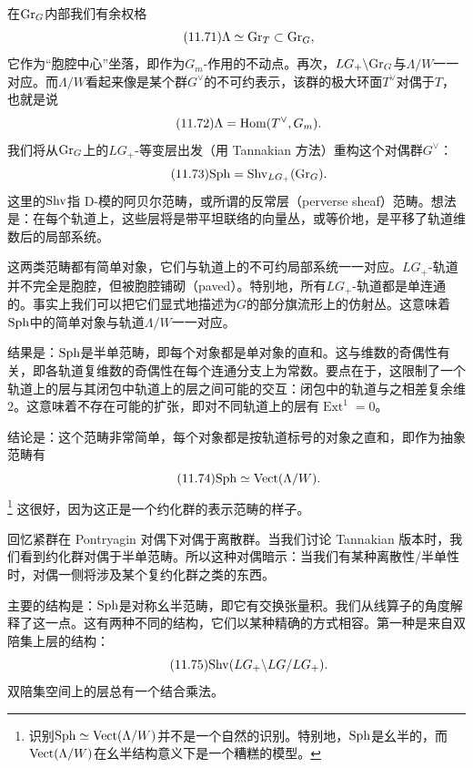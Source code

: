 在$\mathrm{Gr}_G$内部我们有余权格
\begin{equation}\tag{11.71}
\Lambda\simeq\mathrm{Gr}_T\subset\mathrm{Gr}_G,
\end{equation}
它作为“胞腔中心”坐落，即作为$G_m$-作用的不动点。再次，$LG_+\backslash\mathrm{Gr}_G$与$\Lambda/W$一一对应。而$\Lambda/W$看起来像是某个群$G^{\vee}$的不可约表示，该群的极大环面$T^{\vee}$对偶于$T$，也就是说
\begin{equation}\tag{11.72}
\Lambda=\mathrm{Hom}(T^{\vee},G_m).
\end{equation}
我们将从$\mathrm{Gr}_G$上的$LG_+$-等变层出发（用 Tannakian 方法）重构这个对偶群$G^{\vee}$：
\begin{equation}\tag{11.73}
\mathrm{Sph}=\mathrm{Shv}_{LG_+}(\mathrm{Gr}_G).
\end{equation}
这里的$\mathrm{Shv}$指 D-模的阿贝尔范畴，或所谓的反常层（perverse sheaf）范畴。想法是：在每个轨道上，这些层将是带平坦联络的向量丛，或等价地，是平移了轨道维数后的局部系统。

这两类范畴都有简单对象，它们与轨道上的不可约局部系统一一对应。$LG_+$-轨道并不完全是胞腔，但被胞腔铺砌（paved）。特别地，所有$LG_+$-轨道都是单连通的。事实上我们可以把它们显式地描述为$G$的部分旗流形上的仿射丛。这意味着$\mathrm{Sph}$中的简单对象与轨道$\Lambda/W$一一对应。

结果是：$\mathrm{Sph}$是半单范畴，即每个对象都是单对象的直和。这与维数的奇偶性有关，即各轨道复维数的奇偶性在每个连通分支上为常数。要点在于，这限制了一个轨道上的层与其闭包中轨道上的层之间可能的交互：闭包中的轨道与之相差复余维$2$。这意味着不存在可能的扩张，即对不同轨道上的层有$\operatorname{Ext}^{1}=0$。

结论是：这个范畴非常简单，每个对象都是按轨道标号的对象之直和，即作为抽象范畴有
\begin{equation}\tag{11.74}
\mathrm{Sph}\simeq\mathrm{Vect}(\Lambda/W).
\end{equation}
\footnote{识别$\mathrm{Sph}\simeq\mathrm{Vect}(\Lambda/W)$并不是一个自然的识别。特别地，$\mathrm{Sph}$是幺半的，而$\mathrm{Vect}(\Lambda/W)$在幺半结构意义下是一个糟糕的模型。}
这很好，因为这正是一个约化群的表示范畴的样子。

回忆紧群在 Pontryagin 对偶下对偶于离散群。当我们讨论 Tannakian 版本时，我们看到约化群对偶于半单范畴。所以这种对偶暗示：当我们有某种离散性/半单性时，对偶一侧将涉及某个复约化群之类的东西。

主要的结构是：$\mathrm{Sph}$是对称幺半范畴，即它有交换张量积。我们从线算子的角度解释了这一点。这有两种不同的结构，它们以某种精确的方式相容。第一种是来自双陪集上层的结构：
\begin{equation}\tag{11.75}
\mathrm{Shv}(LG_+\backslash LG/LG_+).
\end{equation}
双陪集空间上的层总有一个结合乘法。

